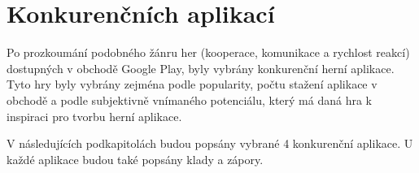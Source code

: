 \chapter{Konkurenčních aplikací}

Po prozkoumání podobného žánru her
(kooperace, komunikace a rychlost reakcí)
dostupných v obchodě Google Play,
byly vybrány konkurenční herní aplikace.
Tyto hry byly vybrány zejména podle popularity,
počtu stažení aplikace v obchodě
a podle subjektivně vnímaného potenciálu,
který má daná hra k inspiraci pro tvorbu herní aplikace.

V následujících podkapitolách budou popsány vybrané 4 konkurenční aplikace.
U každé aplikace budou také popsány klady a zápory.





